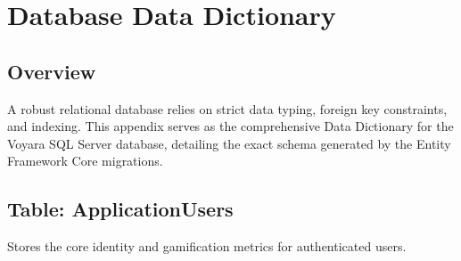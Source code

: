 \chapter{Database Data Dictionary}

\section{Overview}
A robust relational database relies on strict data typing, foreign key constraints, and indexing. This appendix serves as the comprehensive Data Dictionary for the Voyara SQL Server database, detailing the exact schema generated by the Entity Framework Core migrations.

\section{Table: ApplicationUsers}
Stores the core identity and gamification metrics for authenticated users.
